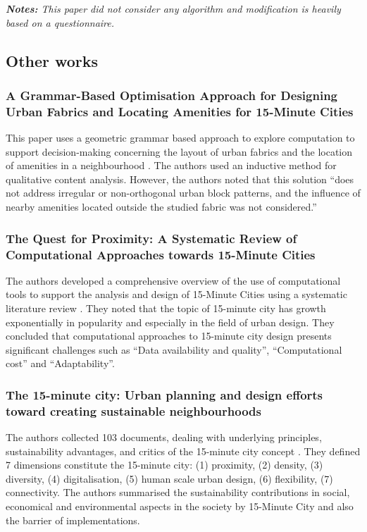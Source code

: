 \textit{\textbf{Notes:} This paper did not consider any algorithm and modification is heavily based on a questionnaire.}

\subsection{Other works}

\subsubsection{A Grammar-Based Optimisation Approach for Designing Urban Fabrics and Locating Amenities for 15-Minute Cities}

This paper uses a geometric grammar based approach to explore computation to support decision-making concerning the layout of urban fabrics and the location of amenities in a neighbourhood \cite{lima_grammar-based_2022}. The authors used an inductive method for qualitative content analysis. However, the authors noted that this solution “does not address irregular or non-orthogonal urban block patterns, and the influence of nearby amenities located outside the studied fabric was not considered.”

\subsubsection{The Quest for Proximity: A Systematic Review of Computational Approaches towards 15-Minute Cities}

The authors developed a comprehensive overview of the use of computational tools to support the analysis and design of 15-Minute Cities using a systematic literature review \cite{lima_quest_2023}. They noted that the topic of 15-minute city has growth exponentially in popularity and especially in the field of urban design. They concluded that computational approaches to 15-minute city design presents significant challenges such as “Data availability and quality”, “Computational cost” and “Adaptability”.

\subsubsection{The 15-minute city: Urban planning and design efforts toward creating sustainable neighbourhoods}

The authors collected 103 documents, dealing with underlying principles, sustainability advantages, and critics of the 15-minute city concept \cite{khavarian-garmsir_15-minute_2023}. They defined 7 dimensions constitute the 15-minute city: (1) proximity, (2) density, (3) diversity, (4) digitalisation, (5) human scale
urban design, (6) flexibility, (7) connectivity. The authors summarised the sustainability contributions in social, economical and environmental aspects in the society by 15-Minute City and also the barrier of implementations.

